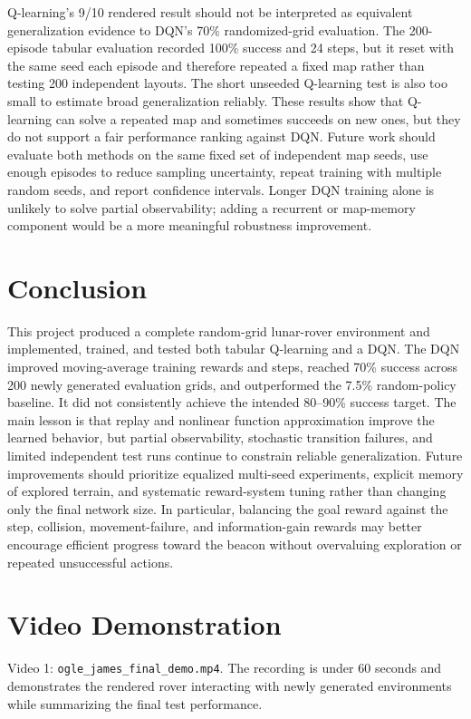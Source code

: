 \documentclass[12pt]{article}
\begin{document}
    Q-learning's 9/10 rendered result should not be interpreted as equivalent generalization evidence to DQN's 70\% randomized-grid evaluation. The 200-episode tabular evaluation recorded 100\% success and 24 steps, but it reset with the same seed each episode and therefore repeated a fixed map rather than testing 200 independent layouts. The short unseeded Q-learning test is also too small to estimate broad generalization reliably. These results show that Q-learning can solve a repeated map and sometimes succeeds on new ones, but they do not support a fair performance ranking against DQN.
    Future work should evaluate both methods on the same fixed set of independent map seeds, use enough episodes to reduce sampling uncertainty, repeat training with multiple random seeds, and report confidence intervals.
    Longer DQN training alone is unlikely to solve partial observability; adding a recurrent or map-memory component would be a more meaningful robustness improvement.

    \section*{Conclusion}
    This project produced a complete random-grid lunar-rover environment and implemented, trained, and tested both tabular Q-learning and a DQN.
    The DQN improved moving-average training rewards and steps, reached 70\% success across 200 newly generated evaluation grids, and outperformed the 7.5\% random-policy baseline.
    It did not consistently achieve the intended 80--90\% success target.
    The main lesson is that replay and nonlinear function approximation improve the learned behavior, but partial observability, stochastic transition failures, and limited independent test runs continue to constrain reliable generalization.
    Future improvements should prioritize equalized multi-seed experiments, explicit memory of explored terrain, and systematic reward-system tuning rather than changing only the final network size.
    In particular, balancing the goal reward against the step, collision, movement-failure, and information-gain rewards may better encourage efficient progress toward the beacon without overvaluing exploration or repeated unsuccessful actions.

    \section*{Video Demonstration}
    Video 1: \texttt{ogle\_james\_final\_demo.mp4}. The recording is under 60 seconds and demonstrates the rendered rover interacting with newly generated environments while summarizing the final test performance.
\end{document}
